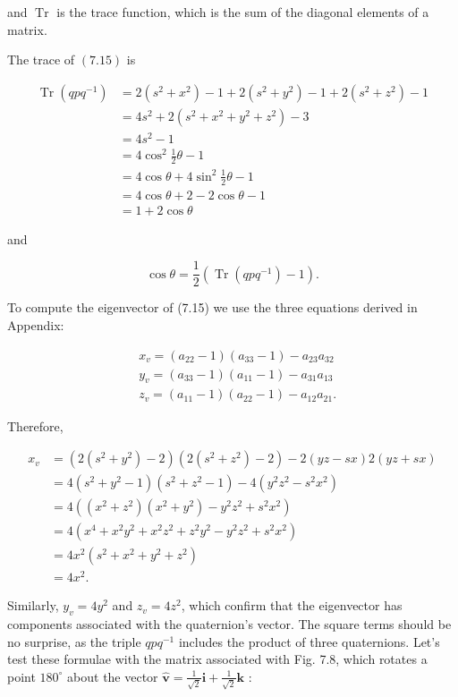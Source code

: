 and $\operatorname{Tr}$ is the trace function, which is the sum of the diagonal elements of a matrix.

The trace of $(7.15)$ is

$$
\begin{aligned}
\operatorname{Tr}\left(q p q^{-1}\right) & =2\left(s^{2}+x^{2}\right)-1+2\left(s^{2}+y^{2}\right)-1+2\left(s^{2}+z^{2}\right)-1 \\
& =4 s^{2}+2\left(s^{2}+x^{2}+y^{2}+z^{2}\right)-3 \\
& =4 s^{2}-1 \\
& =4 \cos ^{2} \frac{1}{2} \theta-1 \\
& =4 \cos \theta+4 \sin ^{2} \frac{1}{2} \theta-1 \\
& =4 \cos \theta+2-2 \cos \theta-1 \\
& =1+2 \cos \theta
\end{aligned}
$$

and

$$
\cos \theta=\frac{1}{2}\left(\operatorname{Tr}\left(q p q^{-1}\right)-1\right) .
$$

To compute the eigenvector of (7.15) we use the three equations derived in Appendix:

$$
\begin{aligned}
& x_{v}=\left(a_{22}-1\right)\left(a_{33}-1\right)-a_{23} a_{32} \\
& y_{v}=\left(a_{33}-1\right)\left(a_{11}-1\right)-a_{31} a_{13} \\
& z_{v}=\left(a_{11}-1\right)\left(a_{22}-1\right)-a_{12} a_{21} .
\end{aligned}
$$

Therefore,

$$
\begin{aligned}
x_{v} & =\left(2\left(s^{2}+y^{2}\right)-2\right)\left(2\left(s^{2}+z^{2}\right)-2\right)-2(y z-s x) 2(y z+s x) \\
& =4\left(s^{2}+y^{2}-1\right)\left(s^{2}+z^{2}-1\right)-4\left(y^{2} z^{2}-s^{2} x^{2}\right) \\
& =4\left(\left(x^{2}+z^{2}\right)\left(x^{2}+y^{2}\right)-y^{2} z^{2}+s^{2} x^{2}\right) \\
& =4\left(x^{4}+x^{2} y^{2}+x^{2} z^{2}+z^{2} y^{2}-y^{2} z^{2}+s^{2} x^{2}\right) \\
& =4 x^{2}\left(s^{2}+x^{2}+y^{2}+z^{2}\right) \\
& =4 x^{2} .
\end{aligned}
$$

Similarly, $y_{v}=4 y^{2}$ and $z_{v}=4 z^{2}$, which confirm that the eigenvector has components associated with the quaternion's vector. The square terms should be no surprise, as the triple $q p q^{-1}$ includes the product of three quaternions. Let's test these formulae with the matrix associated with Fig. 7.8, which rotates a point $180^{\circ}$ about the vector $\hat{\mathbf{v}}=\frac{1}{\sqrt{2}} \mathbf{i}+\frac{1}{\sqrt{2}} \mathbf{k}$ :

